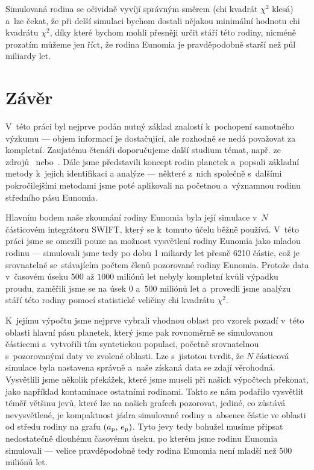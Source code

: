 \documentclass[A4paper, 12pt, oneside]{book}
\begin{document}
Simulovaná rodina se očividně vyvíjí správným směrem (chi kvadrát $\chi^2$ klesá) a~lze čekat, že při delší simulaci bychom dostali nějakou minimální hodnotu chi kvadrátu $\chi^2$, díky které bychom mohli přesněji určit stáří této rodiny, nicméně prozatím můžeme jen říct, že rodina Eunomia je pravděpodobně starší než půl miliardy let.

\chapter{Závěr} \label{ch:zaver}
V~této práci byl nejprve podán nutný základ znalostí k~pochopení samotného výzkumu --- objem informací je dostačující, ale rozhodně se nedá považovat za kompletní. Zaujatému čtenáři doporučujeme další studium témat, např. ze zdrojů~\cite{murray00} nebo~\cite{fmt}. Dále jsme představili koncept rodin planetek a~popsali základní metody k~jejich identifikaci a analýze --- některé z~nich společně s~dalšími pokročilejšími metodami jsme poté aplikovali na početnou a~významnou rodinu středního pásu Eunomia.

Hlavním bodem naše zkoumání rodiny Eunomia byla její simulace v~$N$ částicovém integrátoru SWIFT, který se k~tomuto účelu běžně používá. V~této práci jsme se omezili pouze na možnost vysvětlení rodiny Eunomia jako mladou rodinu --- simulovali jsme tedy po dobu 1 miliardy let přesně 6210 částic, což je srovnatelné se~stávajícím počtem členů pozorované rodiny Eunomia. Protože data v~časovém úseku $500$ až $1000$ miliónů let nebyly kompletní kvůli výpadku proudu, zaměřili jsme se na úsek $0$ a~$500$ miliónů let a~provedli jsme analýzu stáří této rodiny pomocí statistické veličiny chi kvadrátu $\chi^2$.

K~jejímu výpočtu jsme nejprve vybrali vhodnou oblast pro vzorek pozadí v~této oblasti hlavní pásu planetek, který jsme pak rovnoměrně  se simulovanou částicemi a~vytvořili tím syntetickou populaci, početně srovnatelnou s~pozorovanými daty ve zvolené oblasti. Lze s~jistotou tvrdit, že $N$ částicová simulace byla nastavena správně a~naše získaná data se zdají věrohodná. Vysvětlili jsme několik překážek, které jsme museli při našich výpočtech překonat, jako například kontaminace ostatními rodinami. Takto se nám podařilo vysvětlit téměř většinu jevů, které lze na našich grafech pozorovat, jediné, co zůstává nevysvětlené, je kompaktnost jádra simulované rodiny a~absence částic ve oblasti  od středu rodiny na grafu $(a_{\rm p},\,e_{\rm p})$. Tyto jevy tedy bohužel musíme připsat nedostatečně dlouhému časovému úseku, po kterém jsme rodinu Eunomia simulovali --- velice pravděpodobně tedy rodina Eunomia není mladší než $500$ miliónů let.
\end{document}
